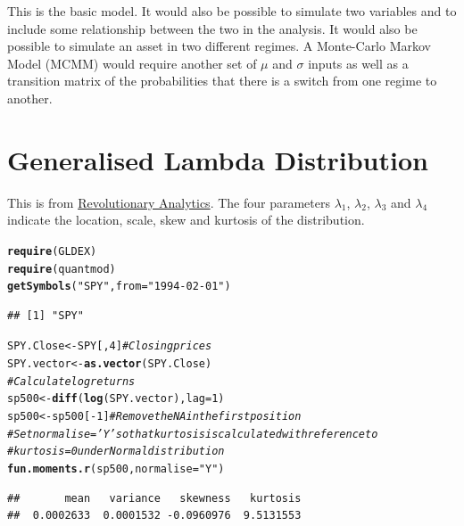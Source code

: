 \documentclass[12pt, a4paper, oneside]{article}\usepackage[]{graphicx}\usepackage[]{color}
\makeatletter
\newcommand{\hlnum}[1]{\textcolor[rgb]{0.686,0.059,0.569}{#1}}%
\newcommand{\hlstr}[1]{\textcolor[rgb]{0.192,0.494,0.8}{#1}}%
\newcommand{\hlcom}[1]{\textcolor[rgb]{0.678,0.584,0.686}{\textit{#1}}}%
\newcommand{\hlopt}[1]{\textcolor[rgb]{0,0,0}{#1}}%
\newcommand{\hlstd}[1]{\textcolor[rgb]{0.345,0.345,0.345}{#1}}%
\newcommand{\hlkwb}[1]{\textcolor[rgb]{0.69,0.353,0.396}{#1}}%
\newcommand{\hlkwc}[1]{\textcolor[rgb]{0.333,0.667,0.333}{#1}}%
\newcommand{\hlkwd}[1]{\textcolor[rgb]{0.737,0.353,0.396}{\textbf{#1}}}%
\newenvironment{kframe}{%
 \def\at@end@of@kframe{}%
 \ifinner\ifhmode%
  \def\at@end@of@kframe{\end{minipage}}%
  \begin{minipage}{\columnwidth}%
 \fi\fi%
 \def\FrameCommand##1{\hskip\@totalleftmargin \hskip-\fboxsep
 \colorbox{shadecolor}{##1}\hskip-\fboxsep
     \hskip-\linewidth \hskip-\@totalleftmargin \hskip\columnwidth}%
 \MakeFramed {\advance\hsize-\width
   \@totalleftmargin\z@ \linewidth\hsize
   \@setminipage}}%
 {\par\unskip\endMakeFramed%
 \at@end@of@kframe}
\newenvironment{knitrout}{}{} %
\makeatother
\begin{document}
This is the basic model.  It would also be possible to simulate two variables and to include some relationship between the two in the analysis.  It would also be possible to simulate an asset in two different regimes. A Monte-Carlo Markov Model (MCMM) would require another set of $\mu$ and $\sigma$ inputs as well as a transition matrix of the probabilities that there is a switch from one regime to another. 
 
\section{Generalised Lambda Distribution}
This is from \href{http://blog.revolutionanalytics.com/2014/02/quantitative-finance-applications-in-r-4-using-the-generalized-lambda-distribution-to-simulate-market-returns.html}{Revolutionary Analytics}.  The four parameters $\lambda_1$, $\lambda_2$, $\lambda_3$ and $\lambda_4$ indicate the location, scale, skew and kurtosis of the distribution. 

\begin{knitrout}
\color{fgcolor}\begin{kframe}
\begin{alltt}
\hlkwd{require}\hlstd{(GLDEX)}
\hlkwd{require}\hlstd{(quantmod)}
\hlkwd{getSymbols}\hlstd{(}\hlstr{"SPY"}\hlstd{,} \hlkwc{from} \hlstd{=} \hlstr{"1994-02-01"}\hlstd{)}
\end{alltt}
\begin{verbatim}
## [1] "SPY"
\end{verbatim}
\begin{alltt}
\hlstd{SPY.Close} \hlkwb{<-} \hlstd{SPY[,} \hlnum{4}\hlstd{]}  \hlcom{# Closing prices}
\hlstd{SPY.vector} \hlkwb{<-} \hlkwd{as.vector}\hlstd{(SPY.Close)}
\hlcom{# Calculate log returns}
\hlstd{sp500} \hlkwb{<-} \hlkwd{diff}\hlstd{(}\hlkwd{log}\hlstd{(SPY.vector),} \hlkwc{lag} \hlstd{=} \hlnum{1}\hlstd{)}
\hlstd{sp500} \hlkwb{<-} \hlstd{sp500[}\hlopt{-}\hlnum{1}\hlstd{]}  \hlcom{# Remove the NA in the first position}
\hlcom{# Set normalise='Y' so that kurtosis is calculated with reference to}
\hlcom{# kurtosis = 0 under Normal distribution}
\hlkwd{fun.moments.r}\hlstd{(sp500,} \hlkwc{normalise} \hlstd{=} \hlstr{"Y"}\hlstd{)}
\end{alltt}
\begin{verbatim}
##       mean   variance   skewness   kurtosis 
##  0.0002633  0.0001532 -0.0960976  9.5131553
\end{verbatim}
\end{kframe}
\end{knitrout}
\end{document}
